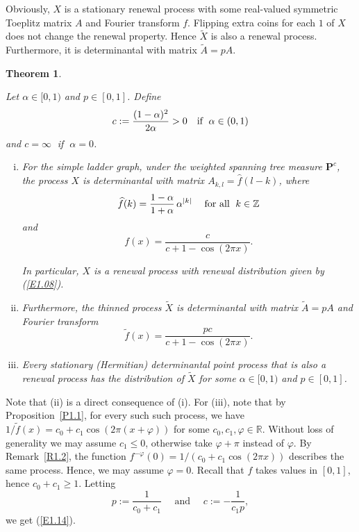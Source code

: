 \documentclass[11pt]{article}
\providecommand{\1}{\mathBB{1}}
\newcommand{\mfalls}{\quad\mbox{if \;}}
\newcommand{\mbu}{\quad\mbox{ and }\quad}
\newcommand{\mfa}{\quad\mbox{\;for all \;}}
\renewcommand{\P}{\mathbf{P}}
\newcommand{\R}{{\mathbb{R}}}
\newcommand{\Z}{{\mathbb{Z}}}
\newcommand{\vp}{\varphi}
\def\hatf{\widehat f}
\newcommand{\equ}[1]{(\ref{#1})}
\newtheorem{theorem}[proposition]{Theorem}
\begin{document}
Obviously, $X$ is a stationary renewal process with some real-valued symmetric Toeplitz matrix $A$ and Fourier transform $f$. Flipping extra coins for each $1$ of $X$ does not change the renewal property. Hence $\tilde X$ is also a renewal process. Furthermore, it is determinantal with matrix $\tilde A=pA$.

\begin{theorem}
\label{T1}

Let $\alpha\in[0,1)$ and $p\in[0,1]$. Define
\begin{equation}
\label{E1.11}
c:=\frac{(1-\alpha)^2}{2\alpha}>0 \mfalls \alpha\in(0,1)
\end{equation}
and $c=\infty\;$ if $\;\alpha=0$.
\begin{enumerate}[(i)]
\item
For the simple ladder graph, under the weighted spanning tree measure $\P^c$, the process $X$ is determinantal with matrix
$A_{k,l}=\hatf(l-k)$, where
\begin{equation}
\label{E1.12}
\hatf(k)=\frac{1-\alpha}{1+\alpha}\,\alpha^{|k|} \mfa k\in\Z
\end{equation}
and
\begin{equation}
\label{E1.13}
f(x)=\frac{c}{\displaystyle c+1-\cos(2\pi x)}.
\end{equation}

In particular, $X$ is a renewal process with renewal distribution given by \equ{E1.08}.

\item
Furthermore, the thinned process $\tilde X$ is determinantal with matrix $\tilde A=pA$ and Fourier transform
\begin{equation}
\label{E1.14}
\tilde f(x)=\frac{pc}{\displaystyle c+1-\cos(2\pi x)}.
\end{equation}
\item
Every stationary (Hermitian) determinantal point process that is also a renewal process has the distribution of $\tilde X$ for some $\alpha\in[0,1)$ and $p\in[0,1]$.
\end{enumerate}
\end{theorem}

Note that (ii) is a direct consequence of (i). For (iii), note that by Proposition~\ref{P1.1}, for every such such process, we have $1/\tilde f(x)=c_0+c_1\cos(2\pi (x+\vp))$ for some $c_0,c_1,\vp\in\R$. Without loss of generality we may assume $c_1\leq0$, otherwise take $\varphi+\pi$ instead of $\varphi$. By Remark~\ref{R1.2}, the function $f^{-\varphi}(0)=1/(c_0+c_1\cos(2\pi x))$ describes the same process. Hence, we may assume $\varphi=0$. Recall that $f$ takes values in $[0,1]$, hence $c_0+c_1\geq1$. Letting
$$p:=\frac{1}{c_0+c_1}\mbu c:=-\frac{1}{c_1p},$$
we get \equ{E1.14}.
\end{document}
